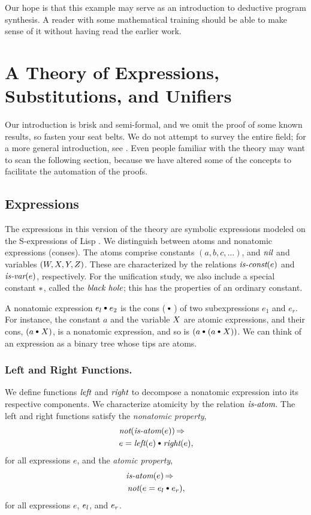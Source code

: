 \documentclass[runningheads]{llncs}
\DeclareMathOperator{\unot}{\emph{not}\kern-.0pt}
\DeclareMathOperator{\uimplies}{\Rightarrow}
\DeclareMathOperator{\isatm}{\emph{is-atom}}
\DeclareMathOperator{\iscnst}{\emph{is-const}}
\DeclareMathOperator{\isvar}{\emph{is-var}}
\DeclareMathOperator{\lef}{\emph{left}}
\DeclareMathOperator{\rig}{\emph{right}}
\begin{document}
    Our hope is that this example may serve as an introduction to deductive program synthesis. A reader with some mathematical training should be able to make sense of it without having read the earlier work.
    
 \section{A Theory of Expressions, Substitutions, and Unifiers}   
Our introduction is brisk and  semi-formal, and we omit the proof of some known results, so fasten your seat belts. We do not attempt to survey the entire field; for a more general introduction, see \citep{baa:sny}.  Even people familiar with the theory may want to scan the following section, because we have altered some of the concepts to facilitate the automation of the proofs.

\subsection{Expressions}\label{par:exp} The expressions in this version of the theory are symbolic expressions modeled on the S-expressions of Lisp  \citep{jmc}.  We distinguish between atoms and nonatomic expressions (conses).  The atoms comprise constants $(a, b, c, \ldots)$, and $\emph{nil}$ and variables $(W, X, Y, Z)$.  These are characterized by the relations $\iscnst(e)$ and $\isvar(e)$, respectively.
For the unification study, we also include a special constant $\ast$, called the $\emph{black hole}$; this has the properties of an ordinary constant.

A nonatomic expression $ \e{l} \cons e_{2} $ is the cons ($\cons$) of two subexpressions $e_{1}$ and $e_{r}$.   For instance, the constant $a$ and the variable  $X$ are atomic expressions, and their cons,  $(a \cons \var{X})$, is a nonatomic expression, and so is $(a \cons (a \cons \var{X}))$. We can think of an expression as a binary tree whose tips are atoms. 

\subsubsection{Left and Right Functions.}We define functions $\lef$ and $\rig$ to decompose a nonatomic expression into its respective components. We characterize atomicity by the relation $\isatm$. The left and right functions satisfy the \emph{nonatomic property},
\begin{align*}
&\unot ({\isatm}(e)) \uimplies \\
&\,e =  {\lef}(e) \cons {\rig}(e),
\end{align*} 
\noindent for all expressions $e$, and the \emph{atomic property},
\begin{align*} 
&{\isatm}(e) \uimplies \\
&\unot (e =  \expsub{e}{l} \cons \expsub{e}{r}),
\end{align*} 
\noindent for all expressions $e$, ${e}_{l}$, and ${e}_{r}$.
\end{document}
